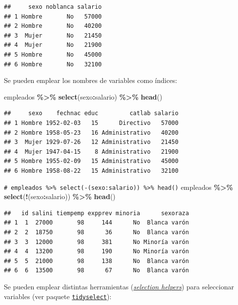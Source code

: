 \documentclass[
]{book}
\newenvironment{Shaded}{\begin{snugshade}}{\end{snugshade}}
\newcommand{\CommentTok}[1]{\textcolor[rgb]{0.56,0.35,0.01}{\textit{#1}}}
\newcommand{\FunctionTok}[1]{\textcolor[rgb]{0.13,0.29,0.53}{\textbf{#1}}}
\newcommand{\NormalTok}[1]{#1}
\newcommand{\SpecialCharTok}[1]{\textcolor[rgb]{0.81,0.36,0.00}{\textbf{#1}}}
\theoremstyle{break}
\theoremstyle{nonumberplain}
\renewcommand{\CommentTok}[1]{\textcolor[rgb]{0.41,0.41,0.41}{\texttt{#1}}}
\begin{document}
\begin{verbatim}
##     sexo noblanca salario
## 1 Hombre       No   57000
## 2 Hombre       No   40200
## 3  Mujer       No   21450
## 4  Mujer       No   21900
## 5 Hombre       No   45000
## 6 Hombre       No   32100
\end{verbatim}

Se pueden emplear los nombres de variables como índices:

\begin{Shaded}
\begin{Highlighting}[]
\NormalTok{empleados }\SpecialCharTok{\%\textgreater{}\%} \FunctionTok{select}\NormalTok{(sexo}\SpecialCharTok{:}\NormalTok{salario) }\SpecialCharTok{\%\textgreater{}\%} \FunctionTok{head}\NormalTok{()}
\end{Highlighting}
\end{Shaded}

\begin{verbatim}
##     sexo    fechnac educ         catlab salario
## 1 Hombre 1952-02-03   15      Directivo   57000
## 2 Hombre 1958-05-23   16 Administrativo   40200
## 3  Mujer 1929-07-26   12 Administrativo   21450
## 4  Mujer 1947-04-15    8 Administrativo   21900
## 5 Hombre 1955-02-09   15 Administrativo   45000
## 6 Hombre 1958-08-22   15 Administrativo   32100
\end{verbatim}

\begin{Shaded}
\begin{Highlighting}[]
\CommentTok{\# empleados \%\textgreater{}\% select({-}(sexo:salario)) \%\textgreater{}\% head()}
\NormalTok{empleados }\SpecialCharTok{\%\textgreater{}\%} \FunctionTok{select}\NormalTok{(}\SpecialCharTok{!}\NormalTok{(sexo}\SpecialCharTok{:}\NormalTok{salario)) }\SpecialCharTok{\%\textgreater{}\%} \FunctionTok{head}\NormalTok{()}
\end{Highlighting}
\end{Shaded}

\begin{verbatim}
##   id salini tiempemp expprev minoria      sexoraza
## 1  1  27000       98     144      No  Blanca varón
## 2  2  18750       98      36      No  Blanca varón
## 3  3  12000       98     381      No Minoría varón
## 4  4  13200       98     190      No Minoría varón
## 5  5  21000       98     138      No  Blanca varón
## 6  6  13500       98      67      No  Blanca varón
\end{verbatim}

Se pueden emplear distintas herramientas (\emph{\href{https://tidyselect.r-lib.org/reference/language.html}{selection helpers}}) para seleccionar variables (ver paquete \href{https://tidyselect.r-lib.org}{\texttt{tidyselect}}):
\end{document}
